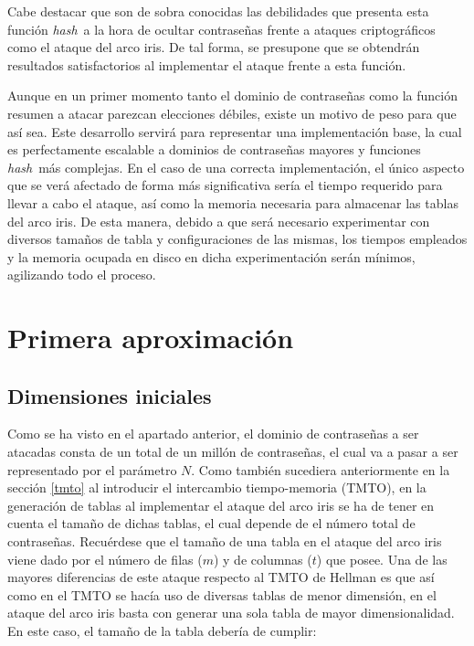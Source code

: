 \documentclass[12pt,spanish,listoffigures,listoftables]{tfgetsinf}
\newcommand{\hash}{\textit{hash}}
\begin{document}
Cabe destacar que son de sobra conocidas las debilidades que presenta esta función \hash~a la hora de ocultar contraseñas frente a ataques criptográficos como el ataque del arco iris. De tal forma, se presupone que se obtendrán resultados satisfactorios al implementar el ataque frente a esta función.

Aunque en un primer momento tanto el dominio de contraseñas como la función resumen a atacar parezcan elecciones débiles, existe un motivo de peso para que así sea. Este desarrollo servirá para representar una implementación base, la cual es perfectamente escalable a dominios de contraseñas mayores y funciones \hash~más complejas. En el caso de una correcta implementación, el único aspecto que se verá afectado de forma más significativa sería el tiempo requerido para llevar a cabo el ataque, así como la memoria necesaria para almacenar las tablas del arco iris. De esta manera, debido a que será necesario experimentar con diversos tamaños de tabla y configuraciones de las mismas, los tiempos empleados y la memoria ocupada en disco en dicha experimentación serán mínimos, agilizando todo el proceso.

\section{Primera aproximación}

\subsection{Dimensiones iniciales}

Como se ha visto en el apartado anterior, el dominio de contraseñas a ser atacadas consta de un total de un millón de contraseñas, el cual va a pasar a ser representado por el parámetro $N$. Como también sucediera anteriormente en la sección \ref{tmto} al introducir el intercambio tiempo-memoria (TMTO), en la generación de tablas al implementar el ataque del arco iris se ha de tener en cuenta el tamaño de dichas tablas, el cual depende de el número total de contraseñas. Recuérdese que el tamaño de una tabla en el ataque del arco iris viene dado por el número de filas ($m$) y de columnas ($t$) que posee. Una de las mayores diferencias de este ataque respecto al TMTO de Hellman es que así como en el TMTO se hacía uso de diversas tablas de menor dimensión, en el ataque del arco iris basta con generar una sola tabla de mayor dimensionalidad. En este caso, el tamaño de la tabla debería de cumplir:
\end{document}
